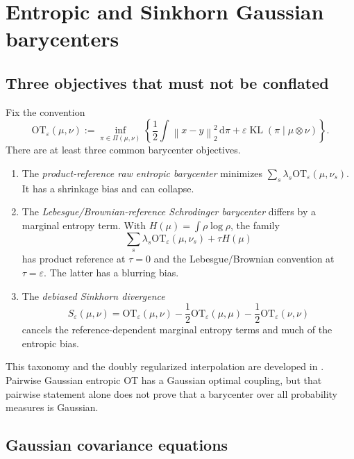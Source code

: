 \documentclass[11pt]{article}
\theoremstyle{definition}
\newcommand{\KL}{\operatorname{KL}}
\newcommand{\eps}{\varepsilon}
\newcommand{\dd}{\,\mathrm d}
\newcommand{\norm}[1]{\left\lVert #1\right\rVert}
\begin{document}
\section{Entropic and Sinkhorn Gaussian barycenters}

\subsection{Three objectives that must not be conflated}

Fix the convention
\begin{equation}\label{eq:EOT-convention}
 \mathrm{OT}_\eps(\mu,\nu)
 :=\inf_{\pi\in\Pi(\mu,\nu)}
 \left\{\frac12\int\norm{x-y}_2^2\dd\pi
 +\eps\KL(\pi\mid\mu\otimes\nu)\right\}.
\end{equation}
There are at least three common barycenter objectives.

\begin{enumerate}
  \item The \emph{product-reference raw entropic barycenter} minimizes
  $\sum_s\lambda_s\mathrm{OT}_\eps(\mu,\nu_s)$.  It has a shrinkage bias and
  can collapse.
  \item The \emph{Lebesgue/Brownian-reference Schrodinger barycenter} differs
  by a marginal entropy term.  With
  $H(\mu)=\int\rho\log\rho$, the family
  \[
    \sum_s\lambda_s\mathrm{OT}_\eps(\mu,\nu_s)+\tau H(\mu)
  \]
  has product reference at $\tau=0$ and the Lebesgue/Brownian convention at
  $\tau=\eps$.  The latter has a blurring bias.
  \item The \emph{debiased Sinkhorn divergence}
  \begin{equation}\label{eq:sinkhorn-divergence}
    S_\eps(\mu,\nu)=\mathrm{OT}_\eps(\mu,\nu)
    -\frac12\mathrm{OT}_\eps(\mu,\mu)
    -\frac12\mathrm{OT}_\eps(\nu,\nu)
  \end{equation}
  cancels the reference-dependent marginal entropy terms and much of the
  entropic bias.
\end{enumerate}

This taxonomy and the doubly regularized interpolation are developed in
\cite{Chizat2025}.  Pairwise Gaussian entropic OT has a Gaussian optimal
coupling, but that pairwise statement alone does not prove that a barycenter
over all probability measures is Gaussian.

\subsection{Gaussian covariance equations}
\end{document}
